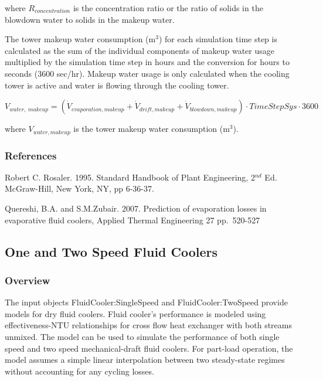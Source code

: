 where \({R_{concentration}}\) is the concentration ratio or the ratio of solids in the blowdown water to solids in the makeup water.

The tower makeup water consumption (m\(^{3}\)) for each simulation time step is calculated as the sum of the individual components of makeup water usage multiplied by the simulation time step in hours and the conversion for hours to seconds (3600 sec/hr). Makeup water usage is only calculated when the cooling tower is active and water is flowing through the cooling tower.

\begin{equation}
{V_{water,\;makeup}} = \left( {{{\dot V}_{evaporation,makeup}} + {{\dot V}_{drift,makeup}} + {{\dot V}_{blowdown,makeup}}} \right)\cdot TimeStepSys\cdot 3600
\end{equation}

where \({V_{water,makeup}}\) is the tower makeup water consumption (m\(^{3}\)).

\subsubsection{References}\label{references-2-003}

Robert C. Rosaler. 1995. Standard Handbook of Plant Engineering, 2\(^{nd}\) Ed. McGraw-Hill, New York, NY, pp 6-36-37.

Quereshi, B.A. and S.M.Zubair. 2007. Prediction of evaporation losses in evaporative fluid coolers, Applied Thermal Engineering 27 pp.~520-527

\subsection{One and Two Speed Fluid Coolers}\label{one-and-two-speed-fluid-coolers}

\subsubsection{Overview}\label{overview-2-005}

The input objects FluidCooler:SingleSpeed and FluidCooler:TwoSpeed provide models for dry fluid coolers. Fluid cooler's performance is modeled using effectiveness-NTU relationships for cross flow heat exchanger with both streams unmixed. The model can be used to simulate the performance of both single speed and two speed mechanical-draft fluid coolers. For part-load operation, the model assumes a simple linear interpolation between two steady-state regimes without accounting for any cycling losses.

